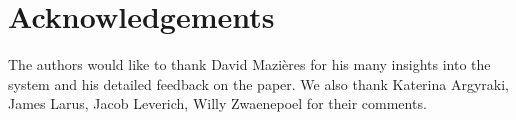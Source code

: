 
\section*{Acknowledgements}

The authors would like to thank David Mazi{\`e}res for his many
insights into the system and his detailed feedback on the
paper. We also thank Katerina Argyraki, James Larus, Jacob Leverich, Willy
Zwaenepoel for their comments.

\begin{comment}
\begin{itemize}
\item David Mazieres
\item Carlos Perez (EPFL) last minute IT setup
\item Detailed comments: Jacob Leverich, Jim Larus
\item High-level comments: Katerina Argyraki, Willy Z, Phil Levis
\item Sheperd
\item VMware Graduate Fellowship (for Adam)
\end{itemize}
\end{comment}


